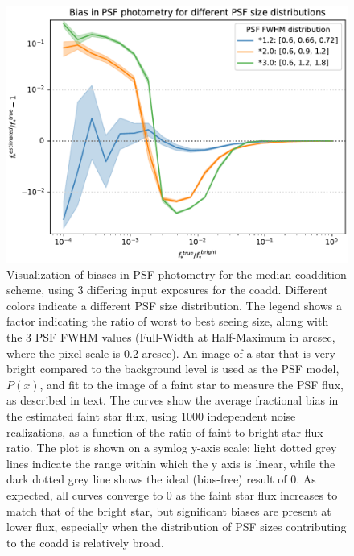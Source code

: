 \documentclass{aastex63}
\newcommand{\irresponse}[1]{{#1}}
\begin{document}
\begin{figure}
\begin{center}
    \includegraphics[width=5in]{figures/median_coadd_bias_dist.pdf}
    \caption{ Visualization of biases in PSF photometry for the median coaddition scheme, using 3 differing input exposures for the coadd.  Different colors indicate a different PSF size distribution. The legend shows a factor indicating the ratio of worst to best seeing size, along with the 3 PSF \irresponse{FWHM} values (\irresponse{Full-Width at Half-Maximum in arcsec, where the pixel scale is 0.2 arcsec}). An image of a star that is very bright compared to the background level is used as the PSF model, $P(x)$,  and fit to the image of a faint star to measure the PSF flux, as described in text. The curves show the average fractional bias in the estimated faint star flux, using 1000 independent noise realizations, as a function of the ratio of faint-to-bright star flux ratio.  The plot is shown on a symlog y-axis scale; light dotted grey lines indicate the range within which the y axis is linear, while the dark dotted grey line shows the ideal (bias-free) result of 0.  As expected, all curves converge to 0 as the faint star flux increases to match that of the bright star, but significant biases are present at lower flux, especially when the distribution of PSF sizes contributing to the coadd is relatively broad.}
    \label{fig:Median Coadd Bias}
\end{center}
\end{figure}
\end{document}
